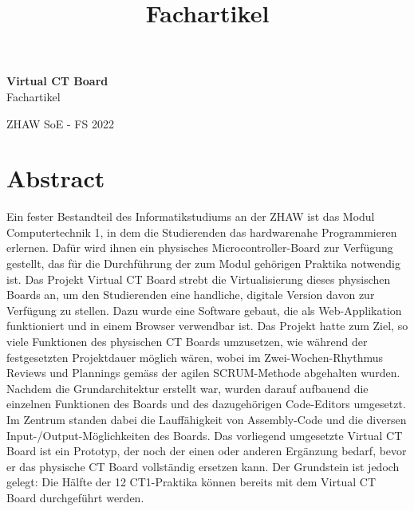 \documentclass[10pt]{article}
\title{Fachartikel}
\begin{document}
\begin{titlepage}

\raggedleft %
	
	\vspace*{\baselineskip} %
	
	
	\vspace*{0.167\textheight} %
	
	\textbf{\LARGE Virtual CT Board}\\[\baselineskip] %
	
	\Huge Fachartikel\\[\baselineskip] %
	
	\vfill %
	
	{\large ZHAW SoE - FS 2022}
	
	\vspace*{3\baselineskip} %


\end{titlepage}

\section*{Abstract}
\thispagestyle{empty}


Ein fester Bestandteil des Informatikstudiums an der ZHAW ist das Modul \glqq Computertechnik 1\grqq, in dem die Studierenden das hardwarenahe Programmieren erlernen. Dafür wird ihnen ein physisches Microcontroller-Board zur Verfügung gestellt, das für die Durchführung der zum Modul gehörigen Praktika notwendig ist. Das Projekt \glqq Virtual CT Board\grqq{} strebt die Virtualisierung dieses physischen Boards an, um den Studierenden eine handliche, digitale Version davon zur Verfügung zu stellen. Dazu wurde eine Software gebaut, die als Web-Applikation funktioniert und in einem Browser verwendbar ist. Das Projekt hatte zum Ziel, so viele Funktionen des physischen CT Boards umzusetzen, wie während der festgesetzten Projektdauer möglich wären, wobei im Zwei-Wochen-Rhythmus Reviews und Plannings gemäss der agilen SCRUM-Methode abgehalten wurden. Nachdem die Grundarchitektur erstellt war, wurden darauf aufbauend die einzelnen Funktionen des Boards und des dazugehörigen Code-Editors umgesetzt. Im Zentrum standen dabei die Lauffähigkeit von Assembly-Code und die diversen Input-/Output-Möglichkeiten des Boards.
\newline Das vorliegend umgesetzte \glqq Virtual CT Board\grqq{} ist ein Prototyp, der noch der einen oder anderen Ergänzung bedarf, bevor er das physische CT Board vollständig ersetzen kann. Der Grundstein ist jedoch gelegt: Die Hälfte der 12 CT1-Praktika können bereits mit dem \glqq Virtual CT Board\grqq{} durchgeführt werden. 
\end{document}
